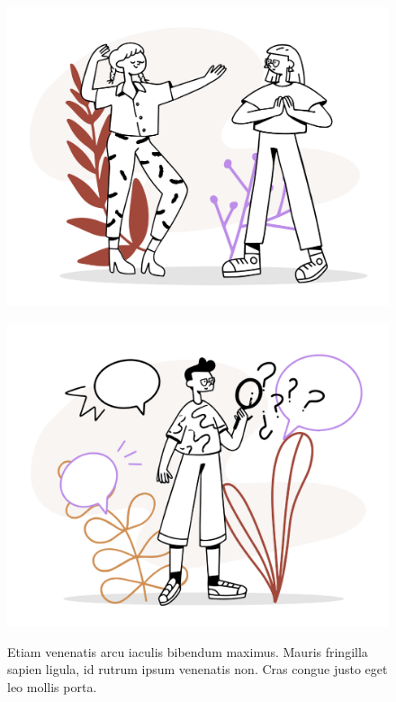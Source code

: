 \begin{figure}[tbp]
  \centering
  \begin{minipage}{0.48\linewidth}
    \centering
    \includegraphics[width=\linewidth]{figs/fig2.pdf}
    \label{fig:left}
  \end{minipage}
  \begin{minipage}{0.48\linewidth}
    \centering
    \includegraphics[width=\linewidth]{figs/fig3.pdf}
    \label{fig:right}
  \end{minipage}
  \caption{Etiam venenatis arcu iaculis bibendum maximus.
  Mauris fringilla sapien ligula, id rutrum ipsum venenatis non.
  Cras congue justo eget leo mollis porta. }
  \label{fig:person}
\end{figure}

